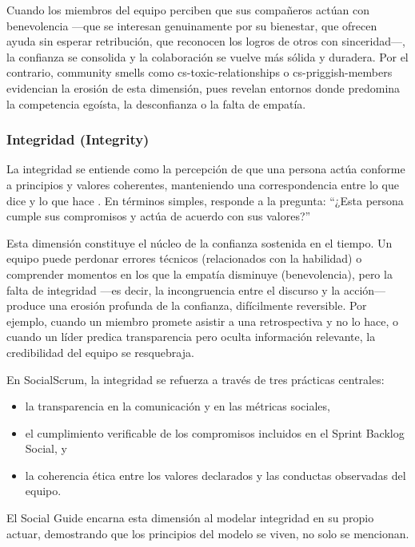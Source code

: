 Cuando los miembros del equipo perciben que sus compañeros actúan con benevolencia —que se interesan genuinamente por su bienestar, que ofrecen ayuda sin esperar retribución, que reconocen los logros de otros con sinceridad—, la confianza se consolida y la colaboración se vuelve más sólida y duradera.
Por el contrario, community smells como \gls{cs-toxic-relationships} o \gls{cs-priggish-members} evidencian la erosión de esta dimensión, pues revelan entornos donde predomina la competencia egoísta, la desconfianza o la falta de empatía.

\subsubsection{Integridad (Integrity)}

La integridad se entiende como la percepción de que una persona actúa conforme a principios y valores coherentes, manteniendo una correspondencia entre lo que dice y lo que hace \cite{mayer_integrative_1995}.
En términos simples, responde a la pregunta: ``¿Esta persona cumple sus compromisos y actúa de acuerdo con sus valores?''

Esta dimensión constituye el núcleo de la confianza sostenida en el tiempo.
Un equipo puede perdonar errores técnicos (relacionados con la habilidad) o comprender momentos en los que la empatía disminuye (benevolencia), pero la falta de integridad —es decir, la incongruencia entre el discurso y la acción— produce una erosión profunda de la confianza, difícilmente reversible.
Por ejemplo, cuando un miembro promete asistir a una retrospectiva y no lo hace, o cuando un líder predica transparencia pero oculta información relevante, la credibilidad del equipo se resquebraja.

En SocialScrum, la integridad se refuerza a través de tres prácticas centrales:

\begin{itemize}
    \item la transparencia en la comunicación y en las métricas sociales,
    \item el cumplimiento verificable de los compromisos incluidos en el Sprint Backlog Social, y
    \item la coherencia ética entre los valores declarados y las conductas observadas del equipo.
\end{itemize}

El Social Guide encarna esta dimensión al modelar integridad en su propio actuar, demostrando que los principios del modelo se viven, no solo se mencionan.

